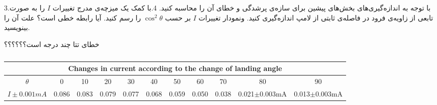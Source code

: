 \documentclass{article}
\begin{document}
\newpage
3.با توجه به اندازه‌گیری‌های بخش‌های پیشین برای     سازه‌ی پرشدگی و خطای آن را محاسبه کنید. 
\newpage
4.با کمک یک میزچه‌ی مدرج تغییرات $I$ را به صورت تابعی از زاویه‌ی فرود در فاصله‌ی ثابتی از لامپ اندازه‌گیری کنید. ونمودار تغییرات $I$ بر حسب $\cos^2 {\theta}$ را رسم کنید. آیا رابطه خطی است؟ علت آن را بینویسید.
 
 
 خطای تتا چند درجه است؟؟؟؟؟؟
 
 
 

\begin{latin}
\vspace{3cm}
\begin{center}
\begin{table}[h!]
\centering

\setlength{\tabcolsep}{8pt}
\renewcommand{\arraystretch}{2}

\begin{tabular}{|c|c|c|c|c|c|c|c|c|c|c|}
\hline
\multicolumn{11}{|c|}{Changes in current according to the change of landing angle} \\
\hline
$\theta$&0&10&20&30&40&50&60&70&80&90\\
\hline
$I\pm0.001mA$&0.086&0.083&0.079&0.077&0.068&0.059&0.050&0.038&0.021$\pm$0.003mA&0.013$\pm$0.003mA\\
\hline
\end{tabular}
\caption{}
\end{table}
\end{center}
\end{latin}
\newpage
\end{document}
